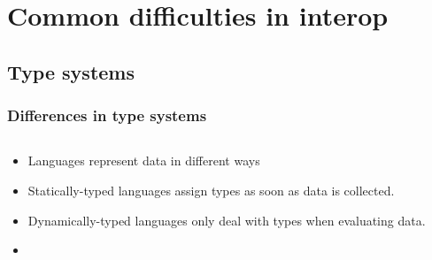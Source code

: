 \documentclass{beamer}
\begin{document}
\section[Difficulties]{Common difficulties in interop}


\subsection{Type systems}
\begin{frame}
  \frametitle{Differences in type systems}
  
  \begin{columns}
  \begin{column}{0.6\textwidth}
  \begin{itemize}
  	\item Languages represent data in different ways %
	\item Statically-typed languages assign types as soon as data is collected.
	\item Dynamically-typed languages only deal with types when evaluating data.
	\item 
  \end{itemize}
  \end{column}


\end{columns}
\end{frame}
\end{document}
